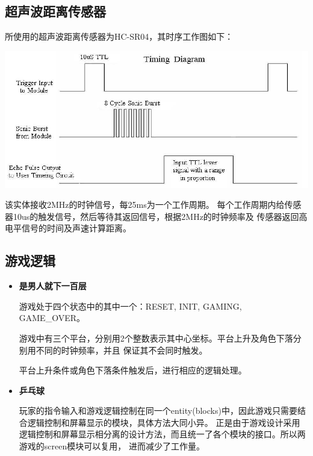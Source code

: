\documentclass{article}
\begin{document}
\subsection{超声波距离传感器}

\begin{spacing}{1.62}
所使用的超声波距离传感器为HC-SR04，其时序工作图如下：

\includegraphics[width=\textwidth]{res/uss-timing.png}

该实体接收2MHz的时钟信号，每25ms为一个工作周期。
每个工作周期内给传感器10us的触发信号，然后等待其返回信号，根据2MHz的时钟频率及
传感器返回高电平信号的时间及声速计算距离。
\end{spacing}

\subsection{游戏逻辑}

\begin{spacing}{1.62}
\begin{itemize}
	\item {\bf 是男人就下一百层}

		游戏处于四个状态中的其中一个：RESET, INIT, GAMING, GAME\_OVER。

		游戏中有三个平台，分别用2个整数表示其中心坐标。平台上升及角色下落分别用不同的时钟频率，并且
		保证其不会同时触发。

		平台上升条件或角色下落条件触发后，进行相应的逻辑处理。

	\item {\bf 乒乓球}

		玩家的指令输入和游戏逻辑控制在同一个entity(blocks)中，因此游戏只需要结合逻辑控制和屏幕显示的模块，具体方法大同小异。
		正是由于游戏设计采用逻辑控制和屏幕显示相分离的设计方法，而且统一了各个模块的接口。所以两游戏的screen模块可以复用，
		进而减少了工作量。

\end{itemize}
\end{spacing}
\end{document}
